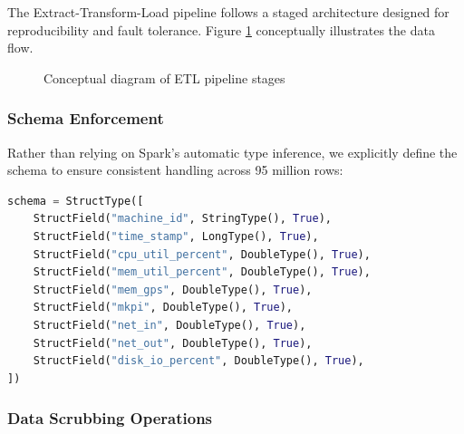 \documentclass[12pt]{report}
\begin{document}
The Extract-Transform-Load pipeline follows a staged architecture designed for reproducibility and fault tolerance. Figure \ref{fig:etl_architecture} conceptually illustrates the data flow.

\begin{figure}[H]
\centering
{}
\caption{Conceptual diagram of ETL pipeline stages}
\label{fig:etl_architecture}
\end{figure}

\subsubsection{Schema Enforcement}

Rather than relying on Spark's automatic type inference, we explicitly define the schema to ensure consistent handling across 95 million rows:

\begin{lstlisting}[language=Python, caption={Spark Schema Definition}]
schema = StructType([
    StructField("machine_id", StringType(), True),
    StructField("time_stamp", LongType(), True),
    StructField("cpu_util_percent", DoubleType(), True),
    StructField("mem_util_percent", DoubleType(), True),
    StructField("mem_gps", DoubleType(), True),
    StructField("mkpi", DoubleType(), True),
    StructField("net_in", DoubleType(), True),
    StructField("net_out", DoubleType(), True),
    StructField("disk_io_percent", DoubleType(), True),
])
\end{lstlisting}

\subsubsection{Data Scrubbing Operations}
\end{document}

